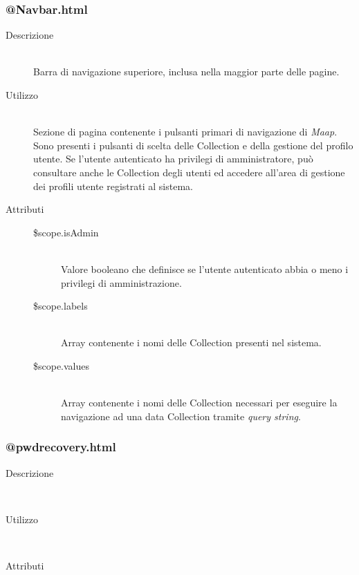 %	
 	

\subsubsection{@Navbar.html}
\begin{description}
	\item[Descrizione] \hfill \\
	Barra di navigazione superiore, inclusa nella maggior parte delle pagine.
	\item[Utilizzo] \hfill \\
	Sezione di pagina contenente i pulsanti primari di navigazione di \textit{Maap}. Sono presenti i pulsanti di scelta delle Collection e della gestione del profilo utente. Se l'utente autenticato ha privilegi di amministratore, può consultare anche le Collection degli utenti ed accedere all'area di gestione dei profili utente registrati al sistema.
	\item[Attributi] \hfill
 	\begin{description}
 		\item[\$scope.isAdmin] \hfill \\
 		Valore booleano che definisce se l'utente autenticato abbia o meno i privilegi di amministrazione.
 		\item[\$scope.labels] \hfill \\
 		Array contenente i nomi delle Collection presenti nel sistema.
 		\item[\$scope.values] \hfill \\
 		Array contenente i nomi delle Collection necessari per eseguire la navigazione ad una data Collection tramite \textit{query string}.
 	\end{description}
\end{description}

\subsubsection{@pwdrecovery.html}
\begin{description}
	\item[Descrizione] \hfill \\
	
	\item[Utilizzo] \hfill \\
	
	\item[Attributi] \hfill
 	
\end{description}

